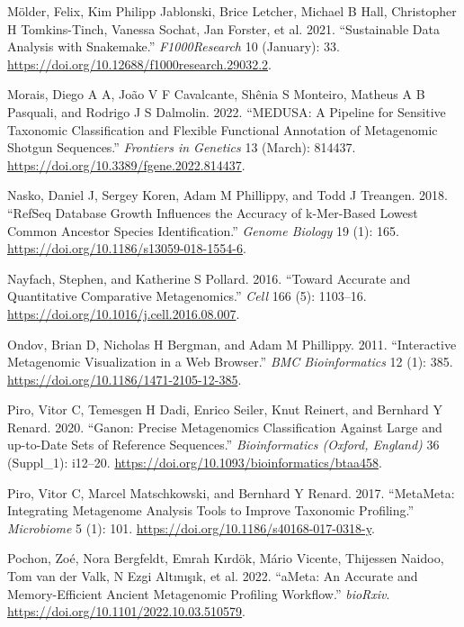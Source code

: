 \documentclass[
]{article}
\newlength{\cslhangindent}
\newlength{\cslentryspacingunit} %
\newenvironment{CSLReferences}[2] %
 {%
  \setlength{\parindent}{0pt}
  \ifodd #1
  \let\oldpar\par
  \def\par{\hangindent=\cslhangindent\oldpar}
  \fi
  \setlength{\parskip}{#2\cslentryspacingunit}
 }%
 {}
\begin{document}
\begin{CSLReferences}{1}{0}
\leavevmode{}%
Mölder, Felix, Kim Philipp Jablonski, Brice Letcher, Michael B Hall,
Christopher H Tomkins-Tinch, Vanessa Sochat, Jan Forster, et al. 2021.
{``Sustainable Data Analysis with Snakemake.''} \emph{F1000Research} 10
(January): 33. \url{https://doi.org/10.12688/f1000research.29032.2}.

\leavevmode{}%
Morais, Diego A A, João V F Cavalcante, Shênia S Monteiro, Matheus A B
Pasquali, and Rodrigo J S Dalmolin. 2022. {``{MEDUSA}: A Pipeline for
Sensitive Taxonomic Classification and Flexible Functional Annotation of
Metagenomic Shotgun Sequences.''} \emph{Frontiers in Genetics} 13
(March): 814437. \url{https://doi.org/10.3389/fgene.2022.814437}.

\leavevmode{}%
Nasko, Daniel J, Sergey Koren, Adam M Phillippy, and Todd J Treangen.
2018. {``{RefSeq} Database Growth Influences the Accuracy of k-Mer-Based
Lowest Common Ancestor Species Identification.''} \emph{Genome Biology}
19 (1): 165. \url{https://doi.org/10.1186/s13059-018-1554-6}.

\leavevmode{}%
Nayfach, Stephen, and Katherine S Pollard. 2016. {``Toward Accurate and
Quantitative Comparative Metagenomics.''} \emph{Cell} 166 (5): 1103--16.
\url{https://doi.org/10.1016/j.cell.2016.08.007}.

\leavevmode{}%
Ondov, Brian D, Nicholas H Bergman, and Adam M Phillippy. 2011.
{``Interactive Metagenomic Visualization in a Web Browser.''} \emph{BMC
Bioinformatics} 12 (1): 385.
\url{https://doi.org/10.1186/1471-2105-12-385}.

\leavevmode{}%
Piro, Vitor C, Temesgen H Dadi, Enrico Seiler, Knut Reinert, and
Bernhard Y Renard. 2020. {``Ganon: Precise Metagenomics Classification
Against Large and up-to-Date Sets of Reference Sequences.''}
\emph{Bioinformatics (Oxford, England)} 36 (Suppl\_1): i12--20.
\url{https://doi.org/10.1093/bioinformatics/btaa458}.

\leavevmode{}%
Piro, Vitor C, Marcel Matschkowski, and Bernhard Y Renard. 2017.
{``{MetaMeta}: Integrating Metagenome Analysis Tools to Improve
Taxonomic Profiling.''} \emph{Microbiome} 5 (1): 101.
\url{https://doi.org/10.1186/s40168-017-0318-y}.

\leavevmode{}%
Pochon, Zoé, Nora Bergfeldt, Emrah Kırdök, Mário Vicente, Thijessen
Naidoo, Tom van der Valk, N Ezgi Altınışık, et al. 2022. {``{aMeta}: An
Accurate and Memory-Efficient Ancient Metagenomic Profiling Workflow.''}
\emph{bioRxiv}. \url{https://doi.org/10.1101/2022.10.03.510579}.


\end{CSLReferences}
\end{document}
